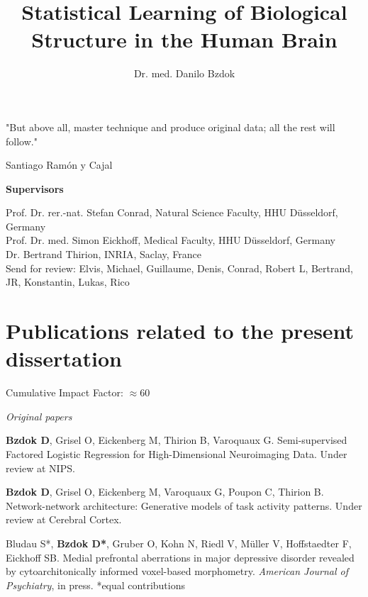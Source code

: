 \documentclass[authoryear,review,3p]{elsarticle}
\begin{document}
\begin{frontmatter}

\title{Statistical Learning of Biological Structure in the Human Brain}

\author{Dr. med. Danilo Bzdok}

\end{frontmatter}

\bigskip
\bigskip
\bigskip
\centerline{
"But above all, master technique and produce original data; 
all the rest will follow."}
\centerline{Santiago Ram\'{o}n y Cajal}

\bigskip
\bigskip
\bigskip

\textbf{Supervisors\\}

Prof. Dr. rer.-nat. Stefan Conrad, Natural Science Faculty, HHU D\"usseldorf, Germany\\

Prof. Dr. med. Simon Eickhoff, Medical Faculty, HHU D\"usseldorf, Germany\\

Dr. Bertrand Thirion, INRIA, Saclay, France\\


Send for review:
Elvis, Michael, Guillaume, Denis, Conrad, Robert L,
Bertrand, JR, Konstantin, Lukas, Rico


\bigskip

\newpage
\section*{Publications related to the present dissertation}

\linebreak
Cumulative Impact Factor: $\approx$60

\linebreak
\textit{Original papers}

\textbf{Bzdok D}, Grisel O, Eickenberg M, Thirion B, Varoquaux G.
Semi-supervised Factored Logistic Regression for High-Dimensional
Neuroimaging Data. Under review at NIPS.

\textbf{Bzdok D}, Grisel O, Eickenberg M, Varoquaux G, Poupon C, Thirion B.
Network-network architecture: Generative models of task activity patterns.
Under review at Cerebral Cortex.

Bludau S*, \textbf{Bzdok D*}, Gruber O,
Kohn N, Riedl V, Müller V, Hoffstaedter F, Eickhoff SB.
Medial prefrontal aberrations in major depressive disorder
revealed by cytoarchitonically informed voxel-based morphometry.
\textit{American Journal of Psychiatry}, in press. *equal contributions
\end{document}
